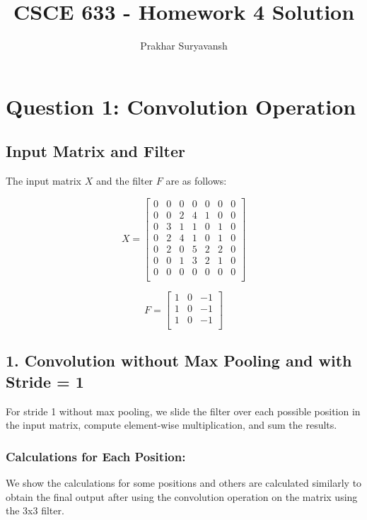 \documentclass{article}
\title{CSCE 633 - Homework 4 Solution}
\author{Prakhar Suryavansh}
\date{} %
\begin{document}
\maketitle

\section*{Question 1: Convolution Operation}

\subsection*{Input Matrix and Filter}
The input matrix \(X\) and the filter \(F\) are as follows:

\[
  X = \begin{bmatrix}
    0 & 0 & 0 & 0 & 0 & 0 & 0 \\
    0 & 0 & 2 & 4 & 1 & 0 & 0 \\
    0 & 3 & 1 & 1 & 0 & 1 & 0 \\
    0 & 2 & 4 & 1 & 0 & 1 & 0 \\
    0 & 2 & 0 & 5 & 2 & 2 & 0 \\
    0 & 0 & 1 & 3 & 2 & 1 & 0 \\
    0 & 0 & 0 & 0 & 0 & 0 & 0 \\
  \end{bmatrix}
\]

\[
  F = \begin{bmatrix}
    1 & 0 & -1 \\
    1 & 0 & -1 \\
    1 & 0 & -1 \\
  \end{bmatrix}
\]

\subsection*{1. Convolution without Max Pooling and with Stride = 1}

For stride 1 without max pooling, we slide the filter over each possible position in the input matrix, compute element-wise multiplication, and sum the results.

\subsubsection*{Calculations for Each Position:}
We show the calculations for some positions and others are calculated similarly to obtain the final output after using the convolution operation on the matrix using the 3x3 filter.
\end{document}
